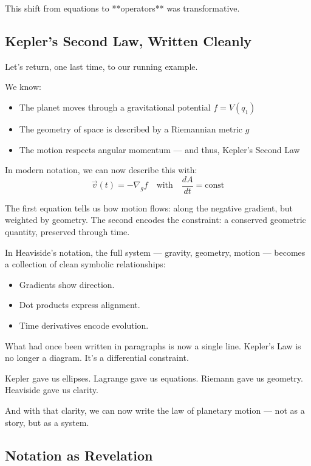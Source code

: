 This shift from equations to **operators** was transformative.

\subsection{Kepler’s Second Law, Written Cleanly}

Let’s return, one last time, to our running example.

We know:
\begin{itemize}
  \item The planet moves through a gravitational potential \( f = V(q_1) \)
  \item The geometry of space is described by a Riemannian metric \( g \)
  \item The motion respects angular momentum — and thus, Kepler’s Second Law
\end{itemize}

In modern notation, we can now describe this with:
\[
\vec{v}(t) = -\nabla_g f
\quad \text{with} \quad
\frac{dA}{dt} = \text{const}
\]

The first equation tells us how motion flows: along the negative gradient, but weighted by geometry.  
The second encodes the constraint: a conserved geometric quantity, preserved through time.

In Heaviside’s notation, the full system — gravity, geometry, motion — becomes a collection of clean symbolic relationships:
\begin{itemize}
    \item Gradients show direction.
    \item Dot products express alignment.
    \item Time derivatives encode evolution.
\end{itemize}

What had once been written in paragraphs is now a single line.  
Kepler’s Law is no longer a diagram. It’s a differential constraint.

\begin{tcolorbox}[colback=blue!5!white, colframe=blue!50!black, title={Heaviside’s Gift to Kepler}]
Kepler gave us ellipses.  
Lagrange gave us equations.  
Riemann gave us geometry.  
Heaviside gave us clarity.

And with that clarity, we can now write the law of planetary motion —  
not as a story, but as a system.
\end{tcolorbox}

\subsection{Notation as Revelation}

